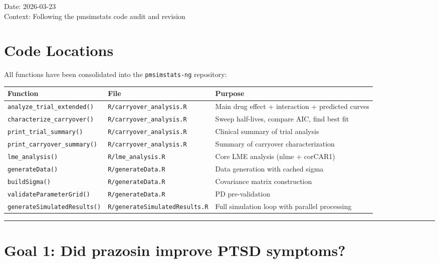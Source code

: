 \documentclass[11pt]{article}
\begin{document}
\maketitle
\thispagestyle{fancy}
\tableofcontents

Date: 2026-03-23\\
Context: Following the pmsimstats code audit and revision

\section{Code Locations}

All functions have been consolidated into the
\texttt{pmsimstats-ng} repository:

\begin{table}[h]
\centering
\small
\begin{tabular}{lll}
\toprule
Function & File & Purpose \\
\midrule
\texttt{analyze\_trial\_extended()} & \texttt{R/carryover\_analysis.R} & Main drug effect + interaction + predicted curves \\
\texttt{characterize\_carryover()} & \texttt{R/carryover\_analysis.R} & Sweep half-lives, compare AIC, find best fit \\
\texttt{print\_trial\_summary()} & \texttt{R/carryover\_analysis.R} & Clinical summary of trial analysis \\
\texttt{print\_carryover\_summary()} & \texttt{R/carryover\_analysis.R} & Summary of carryover characterization \\
\texttt{lme\_analysis()} & \texttt{R/lme\_analysis.R} & Core LME analysis (nlme + corCAR1) \\
\texttt{generateData()} & \texttt{R/generateData.R} & Data generation with cached sigma \\
\texttt{buildSigma()} & \texttt{R/generateData.R} & Covariance matrix construction \\
\texttt{validateParameterGrid()} & \texttt{R/generateData.R} & PD pre-validation \\
\texttt{generateSimulatedResults()} & \texttt{R/generateSimulatedResults.R} & Full simulation loop with parallel processing \\
\bottomrule
\end{tabular}
\end{table}

\bigskip\noindent\rule{\textwidth}{0.4pt}\bigskip

\section{Goal 1: Did prazosin improve PTSD symptoms?}
\end{document}

